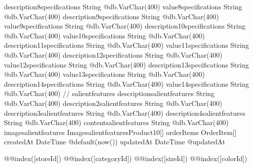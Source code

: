 {  description8specifications   String                         @db.VarChar(400)
  value8specifications         String                         @db.VarChar(400)
  description9specifications   String                         @db.VarChar(400)
  value9specifications         String                         @db.VarChar(400)
  description10specifications  String                         @db.VarChar(400)
  value10specifications        String                         @db.VarChar(400)
  description11specifications  String                         @db.VarChar(400)
  value11specifications        String                         @db.VarChar(400)
  description12specifications  String                         @db.VarChar(400)
  value12specifications        String                         @db.VarChar(400)
  description13specifications  String                         @db.VarChar(400)
  value13specifications        String                         @db.VarChar(400)
  description14specifications  String                         @db.VarChar(400)
  value14specifications        String                         @db.VarChar(400)
  // salientfeatures
  descriptionsalientfeatures   String                         @db.VarChar(400)
  description2salientfeatures  String                         @db.VarChar(400)
  description3salientfeatures  String                         @db.VarChar(400)
  description4salientfeatures  String                         @db.VarChar(400)
  contentsalientfeatures       String                         @db.VarChar(400)
  imagesalientfeatures ImagesalientfeaturesProduct10[]
  orderItems                   OrderItem[]
  createdAt                    DateTime                       @default(now())
  updatedAt                    DateTime                       @updatedAt

  @@index([storeId])
  @@index([categoryId])
  @@index([sizeId])
  @@index([colorId])
}


